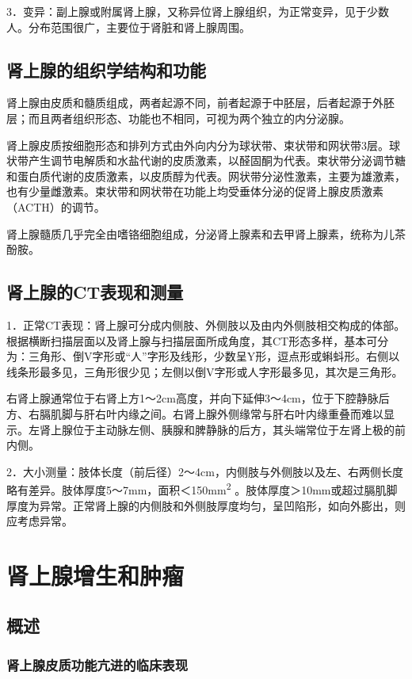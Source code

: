 3．变异：副上腺或附属肾上腺，又称异位肾上腺组织，为正常变异，见于少数人。分布范围很广，主要位于肾脏和肾上腺周围。

\subsection{肾上腺的组织学结构和功能}

肾上腺由皮质和髓质组成，两者起源不同，前者起源于中胚层，后者起源于外胚层；而且两者组织形态、功能也不相同，可视为两个独立的内分泌腺。

肾上腺皮质按细胞形态和排列方式由外向内分为球状带、束状带和网状带3层。球状带产生调节电解质和水盐代谢的皮质激素，以醛固酮为代表。束状带分泌调节糖和蛋白质代谢的皮质激素，以皮质醇为代表。网状带分泌性激素，主要为雄激素，也有少量雌激素。束状带和网状带在功能上均受垂体分泌的促肾上腺皮质激素（ACTH）的调节。

肾上腺髓质几乎完全由嗜铬细胞组成，分泌肾上腺素和去甲肾上腺素，统称为儿茶酚胺。

\subsection{肾上腺的CT表现和测量}

1．正常CT表现：肾上腺可分成内侧肢、外侧肢以及由内外侧肢相交构成的体部。根据横断扫描层面以及肾上腺与扫描层面所成角度，其CT形态多样，基本可分为：三角形、倒V字形或“人”字形及线形，少数呈Y形，逗点形或蝌蚪形。右侧以线条形最多见，三角形很少见；左侧以倒V字形或人字形最多见，其次是三角形。

右肾上腺通常位于右肾上方1～2cm高度，并向下延伸3～4cm，位于下腔静脉后方、右膈肌脚与肝右叶内缘之间。右肾上腺外侧缘常与肝右叶内缘重叠而难以显示。左肾上腺位于主动脉左侧、胰腺和脾静脉的后方，其头端常位于左肾上极的前内侧。

2．大小测量：肢体长度（前后径）2～4cm，内侧肢与外侧肢以及左、右两侧长度略有差异。肢体厚度5～7mm，面积＜150mm\textsuperscript{2}
。肢体厚度＞10mm或超过膈肌脚厚度为异常。正常肾上腺的内侧肢和外侧肢厚度均匀，呈凹陷形，如向外膨出，则应考虑异常。

\section{肾上腺增生和肿瘤}

\subsection{概述}

\subsubsection{肾上腺皮质功能亢进的临床表现}

